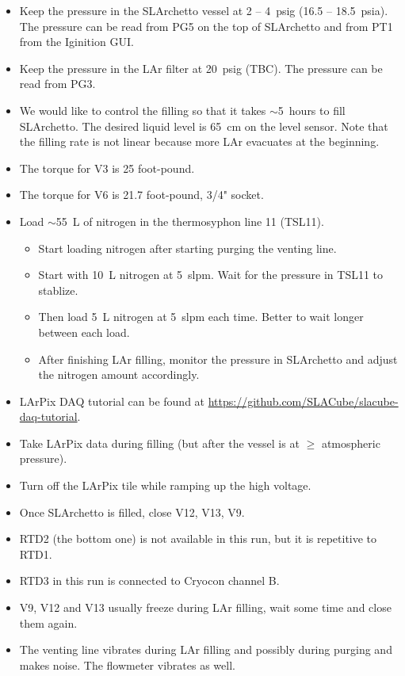 \documentclass[letterpaper,11pt]{article}
\begin{document}
\begin{itemize}
\item Keep the pressure in the SLArchetto vessel at 2 -- 4~psig (16.5 -- 18.5~psia).
The pressure can be read from PG5 on the top of SLArchetto and from PT1 from the Iginition GUI.
\item Keep the pressure in the LAr filter at {\color{orange}20~psig (TBC)}.
The pressure can be read from PG3.
\item We would like to control the filling so that it takes $\sim$5~hours to fill SLArchetto.
The desired liquid level is 65~cm on the level sensor.
Note that the filling rate is not linear because more LAr evacuates at the beginning.
\item The torque for V3 is 25 foot-pound.
\item The torque for V6 is 21.7 foot-pound, 3/4" socket.
\item Load $\sim$55~L of nitrogen in the thermosyphon line 11 (TSL11).
    \begin{itemize}
        \item Start loading nitrogen after starting purging the venting line.
        \item Start with 10~L nitrogen at 5~slpm.  Wait for the pressure in TSL11 to stablize.
        \item Then load 5~L nitrogen at 5~slpm each time.  Better to wait longer between each load.
        \item After finishing LAr filling, monitor the pressure in SLArchetto and adjust the nitrogen 
        amount accordingly.
    \end{itemize}
\item LArPix DAQ tutorial can be found at \url{https://github.com/SLACube/slacube-daq-tutorial}.
\item Take LArPix data during filling (but after the vessel is at $\ge$ atmospheric pressure).
\item Turn off the LArPix tile while ramping up the high voltage.
\item Once SLArchetto is filled, close V12, V13, V9.
\item RTD2 (the bottom one) is not available in this run, but it is repetitive to RTD1.
\item RTD3 in this run is connected to Cryocon channel B.
\item V9, V12 and V13 usually freeze during LAr filling, wait some time and close them again.
\item The venting line vibrates during LAr filling and possibly during purging and makes noise.
The flowmeter vibrates as well.
\end{itemize}
\end{document}
